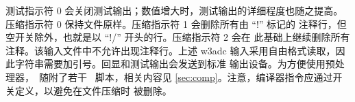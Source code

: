 


\noindent
测试指示符 0 会关闭测试输出；数值增大时，测试输出的详细程度也随之提高。
压缩指示符 0 保持文件原样。压缩指示符 1 会删除所有由 ``{\F !}'' 标记的
注释行，但空开关除外，也就是以 ``{\F !/}'' 开头的行。压缩指示符 2 会在
此基础上继续删除所有注释。该输入文件中不允许出现注释行。上述 {\F w3adc}
输入采用自由格式读取，因此字符串需要加引号。回显和测试输出会发送到标准
输出设备。为方便使用预处理器，\ws\ 随附了若干 \unix\ 脚本，相关内容见
\para\ref{sec:comp}。注意，编译器指令应通过开关定义，以避免在文件压缩时
被删除。
